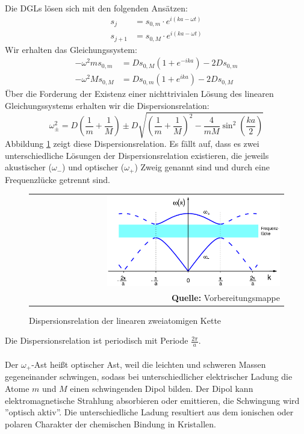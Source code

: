 \documentclass[a4paper,titlepage]{scrartcl}
\numberwithin{equation}{section}
\begin{document}
Die DGLs lösen sich mit den folgenden Ansätzen:
\begin{align*}
s_j&=s_{0,m} \cdot e^{i(ka - \omega t)}\\
s_{j+1}&=s_{0,M} \cdot e^{i(ka - \omega t)}
\end{align*}
Wir erhalten das Gleichungssystem:
\begin{align*}
- \omega^2 m s_{0,m}&=D s_{0,M}(1+e^{-ika})-2D s_{0,m}\\
- \omega^2 M s_{0,M}&=D s_{0,m}(1+e^{ika})-2D s_{0,M}
\end{align*}
Über die Forderung der Existenz einer nichttrivialen Lösung des linearen Gleichungssystems erhalten wir die Dispersionsrelation:
\begin{equation}
\omega^2_{\pm}=D \left(\frac{1}{m} + \frac{1}{M}\right) \pm D \sqrt{\left(\frac{1}{m} + \frac{1}{M}\right)^2-\frac{4}{m M} \sin^2{\left(\frac{ka}{2}\right)}}
\label{eq:dispersionsrelationzweiatom}
\end{equation}
Abbildung \ref{fig:zweiatomkettedispersion} zeigt diese Dispersionsrelation. Es fällt auf, dass es zwei unterschiedliche Lösungen der Dispersionsrelation existieren, die jeweils akustischer ($\omega_{-}$) und optischer ($\omega_{+}$) Zweig genannt sind und durch eine Frequenzlücke getrennt sind.
\begin{figure}[H]
	\centering
	\begin{tabular}{@{}r@{}}
		\includegraphics[width=0.7\textwidth]{zweiatomkettedispersion.png}\\
		\footnotesize\sffamily\textbf{Quelle:} Vorbereitungsmappe \cite{vorbereitungsmappe}
	\end{tabular}
	\caption{Dispersionsrelation der linearen zweiatomigen Kette}
    \label{fig:zweiatomkettedispersion}
\end{figure}
Die Dispersionsrelation ist periodisch mit Periode $\frac{2 \pi}{a}$.\\ \\
Der $\omega_{+}$-Ast heißt optischer Ast, weil die leichten und schweren Massen gegeneinander schwingen, sodass bei unterschiedlicher elektrischer Ladung die Atome $m$ und $M$ einen schwingenden Dipol bilden. Der Dipol kann elektromagnetische Strahlung absorbieren oder emittieren, die Schwingung wird ''optisch aktiv''. Die unterschiedliche Ladung resultiert aus dem ionischen oder polaren Charakter der chemischen Bindung in Kristallen.\\ \\
\end{document}
